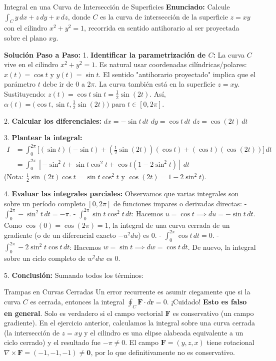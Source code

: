 \documentclass[11pt,a4paper]{article}
\begin{document}
\begin{ejerciciobox}{Integral en una Curva de Intersección de Superficies}
\textbf{Enunciado:} Calcule $\int_C y \, dx + z \, dy + x \, dz$, donde $C$ es la curva de intersección de la superficie $z = xy$ con el cilindro $x^2 + y^2 = 1$, recorrida en sentido antihorario al ser proyectada sobre el plano $xy$.

\textbf{Solución Paso a Paso:}
1. \textbf{Identificar la parametrización de $C$:}
La curva $C$ vive en el cilindro $x^2 + y^2 = 1$. Es natural usar coordenadas cilíndricas/polares:
$x(t) = \cos t$ y $y(t) = \sin t$.
El sentido "antihorario proyectado" implica que el parámetro $t$ debe ir de $0$ a $2\pi$.
La curva también está en la superficie $z = xy$. Sustituyendo:
$z(t) = \cos t \sin t = \frac{1}{2} \sin(2t)$.
Así, $\alpha(t) = \big( \cos t, \sin t, \frac{1}{2} \sin(2t) \big)$ para $t \in [0, 2\pi]$.

2. \textbf{Calcular los diferenciales:}
$dx = -\sin t \, dt$
$dy = \cos t \, dt$
$dz = \cos(2t) \, dt$

3. \textbf{Plantear la integral:}
\begin{align*}
I &= \int_0^{2\pi} \Big[ (\sin t)(-\sin t) + \left(\frac{1}{2}\sin(2t)\right)(\cos t) + (\cos t)(\cos(2t)) \Big] \, dt \\
&= \int_0^{2\pi} \left[ -\sin^2 t + \sin t \cos^2 t + \cos t (1 - 2\sin^2 t) \right] \, dt
\end{align*}
(Nota: $\frac{1}{2}\sin(2t)\cos t = \sin t \cos^2 t$ y $\cos(2t) = 1 - 2\sin^2 t$).

4. \textbf{Evaluar las integrales parciales:}
Observamos que varias integrales son sobre un período completo $[0, 2\pi]$ de funciones impares o derivadas directas:
- $\int_0^{2\pi} -\sin^2 t \, dt = -\pi$.
- $\int_0^{2\pi} \sin t \cos^2 t \, dt$: Hacemos $u = \cos t \implies du = -\sin t \, dt$. Como $\cos(0) = \cos(2\pi) = 1$, la integral de una curva cerrada de un gradiente (o de un diferencial exacto $-u^2 du$) es $0$.
- $\int_0^{2\pi} \cos t \, dt = 0$.
- $\int_0^{2\pi} -2\sin^2 t \cos t \, dt$: Hacemos $w = \sin t \implies dw = \cos t \, dt$. De nuevo, la integral sobre un ciclo completo de $w^2 dw$ es $0$.

5. \textbf{Conclusión:}
Sumando todos los términos:
\end{ejerciciobox}

\begin{errorbox}{Trampas en Curvas Cerradas}
Un error recurrente es asumir ciegamente que si la curva $C$ es cerrada, entonces la integral $\oint_C \mathbf{F} \cdot d\mathbf{r} = 0$. ¡Cuidado! \textbf{Esto es falso en general}.
Solo es verdadero si el campo vectorial $\mathbf{F}$ es conservativo (un campo gradiente). En el ejercicio anterior, calculamos la integral sobre una curva cerrada (la intersección de $z=xy$ y el cilindro es una elipse alabeada equivalente a un ciclo cerrado) y el resultado fue $-\pi \neq 0$. El campo $\mathbf{F} = (y, z, x)$ tiene rotacional $\nabla \times \mathbf{F} = (-1, -1, -1) \neq \mathbf{0}$, por lo que definitivamente no es conservativo.
\end{errorbox}
\end{document}
